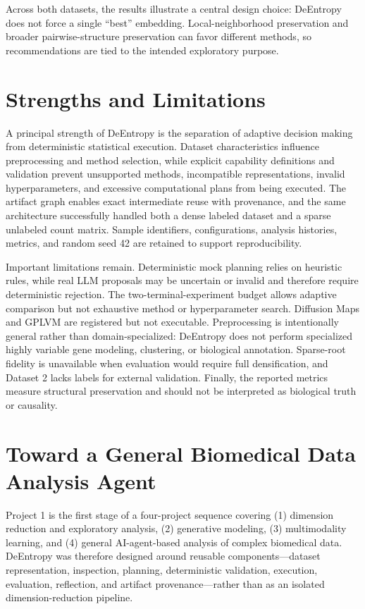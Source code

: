 \documentclass[10pt]{article}
\begin{document}
Across both datasets, the results illustrate a central design choice:
DeEntropy does not force a single ``best'' embedding. Local-neighborhood
preservation and broader pairwise-structure preservation can favor different
methods, so recommendations are tied to the intended exploratory purpose.

\section{Strengths and Limitations}

A principal strength of DeEntropy is the separation of adaptive
decision making from deterministic statistical execution. Dataset
characteristics influence preprocessing and method selection, while explicit
capability definitions and validation prevent unsupported methods, incompatible
representations, invalid hyperparameters, and excessive computational plans
from being executed. The artifact graph enables exact intermediate reuse with
provenance, and the same architecture successfully handled both a dense labeled
dataset and a sparse unlabeled count matrix. Sample identifiers,
configurations, analysis histories, metrics, and random seed 42 are retained
to support reproducibility.

Important limitations remain. Deterministic mock planning relies on heuristic
rules, while real LLM proposals may be uncertain or invalid and therefore
require deterministic rejection. The two-terminal-experiment budget allows
adaptive comparison but not exhaustive method or hyperparameter search.
Diffusion Maps and GPLVM are registered but not executable. Preprocessing is
intentionally general rather than domain-specialized: DeEntropy does not
perform specialized highly variable gene modeling, clustering, or biological
annotation. Sparse-root fidelity is unavailable when evaluation would require
full densification, and Dataset 2 lacks labels for external validation.
Finally, the reported metrics measure structural preservation and should not
be interpreted as biological truth or causality.

\section{Toward a General Biomedical Data Analysis Agent}

Project 1 is the first stage of a four-project sequence covering
(1) dimension reduction and exploratory analysis,
(2) generative modeling,
(3) multimodality learning, and
(4) general AI-agent-based analysis of complex biomedical data.
DeEntropy was therefore designed around reusable components---dataset
representation, inspection, planning, deterministic validation, execution,
evaluation, reflection, and artifact provenance---rather than as an isolated
dimension-reduction pipeline.
\end{document}
